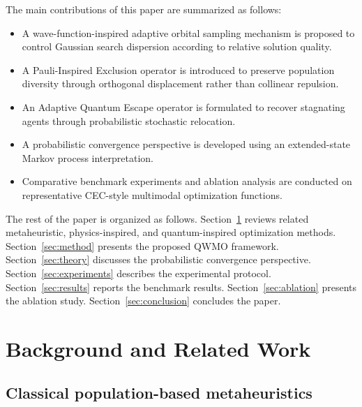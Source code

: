 \documentclass[final,5p,times,twocolumn]{elsarticle}
\begin{document}
The main contributions of this paper are summarized as follows:

\begin{itemize}
    \item A wave-function-inspired adaptive orbital sampling
    mechanism is proposed to control Gaussian search dispersion
    according to relative solution quality.

    \item A Pauli-Inspired Exclusion operator is introduced to
    preserve population diversity through orthogonal displacement
    rather than collinear repulsion.

    \item An Adaptive Quantum Escape operator is formulated to
    recover stagnating agents through probabilistic stochastic
    relocation.

    \item A probabilistic convergence perspective is developed
    using an extended-state Markov process interpretation.

    \item Comparative benchmark experiments and ablation analysis
    are conducted on representative CEC-style multimodal
    optimization functions.
\end{itemize}

The rest of the paper is organized as follows.
Section~\ref{sec:background} reviews related metaheuristic,
physics-inspired, and quantum-inspired optimization methods.
Section~\ref{sec:method} presents the proposed QWMO framework.
Section~\ref{sec:theory} discusses the probabilistic convergence
perspective. Section~\ref{sec:experiments} describes the
experimental protocol. Section~\ref{sec:results} reports the
benchmark results. Section~\ref{sec:ablation} presents the
ablation study. Section~\ref{sec:conclusion} concludes the paper.


\section{Background and Related Work}
\label{sec:background}

\subsection{Classical population-based metaheuristics}
\end{document}
